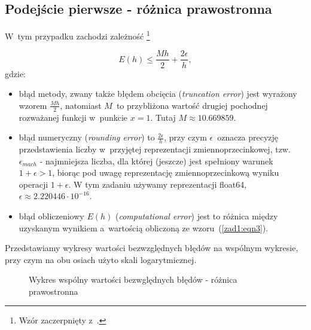\subsection{Podejście pierwsze - różnica prawostronna}

\quad W~tym przypadku zachodzi zależność \footnote{Wzór zaczerpnięty z~\cite{teams_materials}.}

\begin{equation}
	E(h) \le \frac{Mh}{2}+\frac{2\epsilon}{h},
	\label{zad1:eqn4}
\end{equation}
gdzie:

\begin{itemize}
	\item błąd metody, zwany także błędem obcięcia (\emph{truncation error}) jest wyrażony wzorem $\frac{Mh}{2}$, natomiast $M$~to przybliżona wartość drugiej pochodnej rozważanej funkcji w~punkcie $x=1$. Tutaj $M \approx 10.669859$.
	\item błąd numeryczny (\emph{rounding error}) to $\frac{2\epsilon}{h}$, przy czym $\epsilon$~oznacza precyzję przedstawienia liczby w~przyjętej reprezentacji zmiennoprzecinkowej, tzw. $\epsilon_{mach}$ - najmniejsza liczba, dla której (jeszcze) jest spełniony warunek $1+\epsilon > 1$, biorąc pod uwagę reprezentację zmiennoprzecinkową wyniku operacji $1+\epsilon$. W tym zadaniu używamy reprezentacji float64, $\epsilon \approx 2.220446 \cdot 10^{-16}$.
	\item błąd obliczeniowy $E(h)$ (\emph{computational error}) jest to różnica między uzyskanym wynikiem a~wartością obliczoną ze wzoru~(\ref{zad1:eqn3}).
\end{itemize}
Przedstawiamy wykresy wartości bezwzględnych błędów na wspólnym wykresie, przy czym na obu osiach użyto skali logarytmicznej.

\begin{figure}[h!]
	\caption{Wykres wspólny wartości bezwględnych błędów - różnica prawostronna}
	\label{zad1:graph1}
\end{figure}

